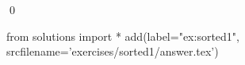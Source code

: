 
\begin{ex} 
  \label{ex:sorted1}
  
  \qed
\end{ex} 
\begin{python0}
from solutions import *
add(label="ex:sorted1",
    srcfilename='exercises/sorted1/answer.tex') 
\end{python0}
